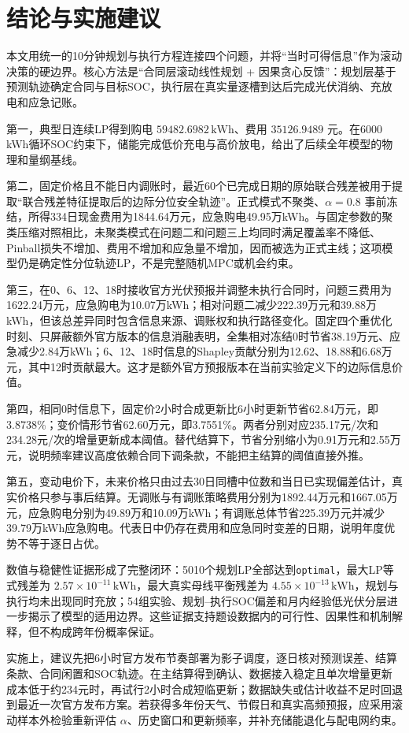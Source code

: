 \section{结论与实施建议}

本文用统一的10分钟规划与执行方程连接四个问题，并将“当时可得信息”作为滚动决策的硬边界。核心方法是“合同层滚动线性规划 + 因果贪心反馈”：规划层基于预测轨迹确定合同与目标SOC，执行层在真实量逐槽到达后完成光伏消纳、充放电和应急记账。

第一，典型日连续LP得到购电 $59482.6982\,\mathrm{kWh}$、费用 $35126.9489$ 元。在6000 kWh循环SOC约束下，储能完成低价充电与高价放电，给出了后续全年模型的物理和量纲基线。

第二，固定价格且不能日内调账时，最近60个已完成日期的原始联合残差被用于提取“联合残差特征提取后的边际分位安全轨迹”。正式模式不聚类、$\alpha=0.8$ 事前冻结，所得334日现金费用为1844.64万元，应急购电49.95万kWh。与固定参数的聚类压缩对照相比，未聚类模式在问题二和问题三上均同时满足覆盖率不降低、Pinball损失不增加、费用不增加和应急量不增加，因而被选为正式主线；这项模型仍是确定性分位轨迹LP，不是完整随机MPC或机会约束。

第三，在0、6、12、18时接收官方光伏预报并调整未执行合同时，问题三费用为1622.24万元，应急购电为10.07万kWh；相对问题二减少222.39万元和39.88万kWh，但该总差异同时包含信息来源、调账权和执行路径变化。固定四个重优化时刻、只屏蔽额外官方版本的信息消融表明，全集相对冻结0时节省38.19万元、应急减少2.84万kWh；6、12、18时信息的Shapley贡献分别为12.62、18.88和6.68万元，其中12时贡献最大。这才是额外官方预报版本在当前实验定义下的边际信息价值。

第四，相同0时信息下，固定价2小时合成更新比6小时更新节省62.84万元，即3.8738\%；变价情形节省62.60万元，即3.7551\%。两者分别对应235.17元/次和234.28元/次的增量更新成本阈值。替代结算下，节省分别缩小为0.91万元和2.55万元，说明频率建议高度依赖合同下调条款，不能把主结算的阈值直接外推。

第五，变动电价下，未来价格只由过去30日同槽中位数和当日已实现偏差估计，真实价格只参与事后结算。无调账与有调账策略费用分别为1892.44万元和1667.05万元，应急购电分别为49.89万和10.09万kWh；有调账总体节省225.39万元并减少39.79万kWh应急购电。代表日中仍存在费用和应急同时变差的日期，说明年度优势不等于逐日占优。

数值与稳健性证据形成了完整闭环：5010个规划LP全部达到\texttt{optimal}，最大LP等式残差为 $2.57\times10^{-11}\,\mathrm{kWh}$，最大真实母线平衡残差为 $4.55\times10^{-13}\,\mathrm{kWh}$，规划与执行均未出现同时充放；54组实验、规划--执行SOC偏差和月内经验低光伏分层进一步揭示了模型的适用边界。这些证据支持题设数据内的可行性、因果性和机制解释，但不构成跨年份概率保证。

实施上，建议先把6小时官方发布节奏部署为影子调度，逐日核对预测误差、结算条款、合同闲置和SOC轨迹。在主结算得到确认、数据接入稳定且单次增量更新成本低于约234元时，再试行2小时合成短临更新；数据缺失或估计收益不足时回退到最近一次官方发布方案。若获得多年份天气、节假日和真实高频预报，应采用滚动样本外检验重新评估 $\alpha$、历史窗口和更新频率，并补充储能退化与配电网约束。
